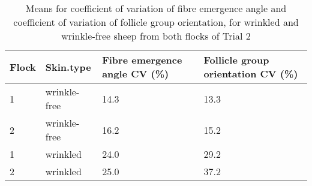 %

\begin{table}[ht]
\centering
\caption{Means for coefficient of variation of fibre emergence angle and coefficient of variation of follicle group orientation, for wrinkled and wrinkle-free sheep from both flocks of Trial 2}
\label{tab:disrupt}
\vspace{0.1in}
\begin{tabular}{|p{0.5in}|p{0.6in}|p{0.6in}|p{0.6in}|} \hline
  Flock & Skin.type & Fibre emergence angle CV (\%)  & Follicle group orientation CV (\%) \\   
    \hline
  1 & wrinkle-free & 14.3 & 13.3   \\ 
  2 & wrinkle-free & 16.2 & 15.2   \\ 
  1 & wrinkled & 24.0 & 29.2  \\ 
  2 & wrinkled & 25.0 & 37.2   \\ 
   \hline
\end{tabular}
\end{table}

%


